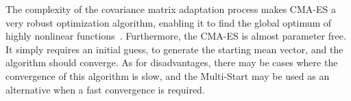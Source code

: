 The complexity of the covariance matrix adaptation process makes CMA-ES a very robust optimization algorithm, enabling it to find the global optimum of highly nonlinear functions~\cite{DilaoCMA}.
Furthermore, the CMA-ES is almost parameter free. It simply requires an initial guess, to generate the starting mean vector, and the algorithm should converge.
As for disadvantages, there may be cases where the convergence of this algorithm is slow, and the Multi-Start may be used as an alternative when a fast convergence is required.





